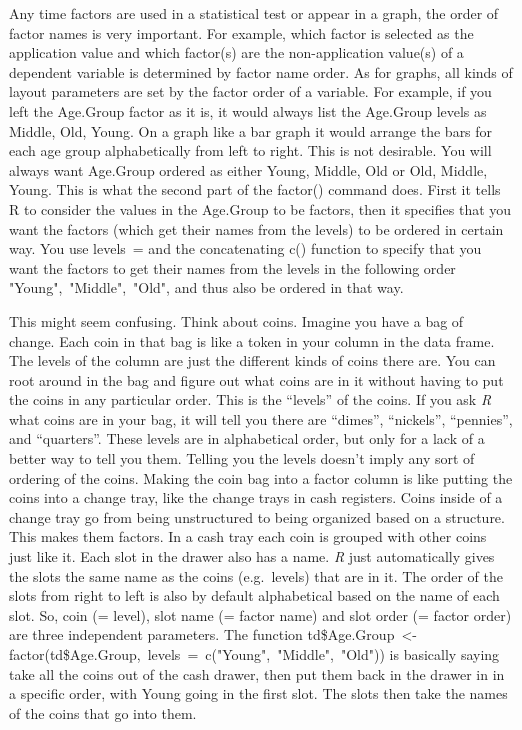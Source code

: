 \documentclass[
  12pt,
  letterpaper]{article}
\renewcommand\texttt[1]{{\ttfamily\color{BrickRed}#1}}
\begin{document}
Any time factors are used in a statistical test or appear in a graph,
the order of factor names is very important. For example, which factor
is selected as the application value and which factor(s) are the
non-application value(s) of a dependent variable is determined by factor
name order. As for graphs, all kinds of layout parameters are set by the
factor order of a variable. For example, if you left the
\texttt{Age.Group} factor as it is, it would always list the
\texttt{Age.Group} levels as \texttt{Middle}, \texttt{Old},
\texttt{Young}. On a graph like a bar graph it would arrange the bars
for each age group alphabetically from left to right. This is not
desirable. You will always want \texttt{Age.Group} ordered as either
\texttt{Young}, \texttt{Middle}, \texttt{Old} or \texttt{Old},
\texttt{Middle}, \texttt{Young}. This is what the second part of the
\texttt{factor()} command does. First it tells \texttt{R} to consider
the values in the \texttt{Age.Group} to be factors, then it specifies
that you want the factors (which get their names from the levels) to be
ordered in certain way. You use \texttt{levels\ =} and the concatenating
\texttt{c()} function to specify that you want the factors to get their
names from the levels in the following order
\texttt{"Young",\ "Middle",\ "Old"}, and thus also be ordered in that
way.

This might seem confusing. Think about coins. Imagine you have a bag of
change. Each coin in that bag is like a token in your column in the data
frame. The levels of the column are just the different kinds of coins
there are. You can root around in the bag and figure out what coins are
in it without having to put the coins in any particular order. This is
the ``levels'' of the coins. If you ask \emph{R} what coins are in your
bag, it will tell you there are ``dimes'', ``nickels'', ``pennies'', and
``quarters''. These levels are in alphabetical order, but only for a
lack of a better way to tell you them. Telling you the levels doesn't
imply any sort of ordering of the coins. Making the coin bag into a
factor column is like putting the coins into a change tray, like the
change trays in cash registers. Coins inside of a change tray go from
being unstructured to being organized based on a structure. This makes
them factors. In a cash tray each coin is grouped with other coins just
like it. Each slot in the drawer also has a name. \emph{R} just
automatically gives the slots the same name as the coins (e.g.~levels)
that are in it. The order of the slots from right to left is also by
default alphabetical based on the name of each slot. So, coin (= level),
slot name (= factor name) and slot order (= factor order) are three
independent parameters. The function
\texttt{td\$Age.Group\ \textless{}-factor(td\$Age.Group,\ levels\ =\ c("Young",\ "Middle",\ "Old"))}
is basically saying take all the coins out of the cash drawer, then put
them back in the drawer in in a specific order, with \texttt{Young}
going in the first slot. The slots then take the names of the coins that
go into them.
\end{document}

